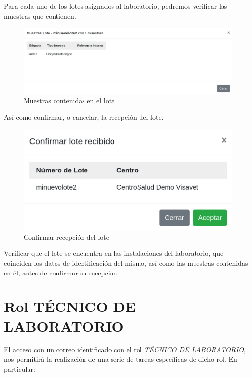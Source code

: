 \documentclass[a4paper,spanish]{paper}
\begin{document}
Para cada uno de los lotes asignados al laboratorio, podremos verificar las muestras que contienen.

\begin{figure}[h]
\centering
\includegraphics[scale=0.6]{Figs/Fig12.png}
\caption{Muestras contenidas en el lote}
\label{Fig12}
\end{figure}

Así como confirmar, o cancelar, la recepción del lote.

\begin{figure}[h]
\centering
\includegraphics[scale=0.6]{Figs/Fig13.png}
\caption{Confirmar recepción del lote}
\label{Fig13}
\end{figure}

\medskip
\begin{tcolorbox}[colback=blue!3!white,colframe=blue(ryb)!50!black,title=\textbf{Tip}]

Verificar que el lote se encuentra en las instalaciones del laboratorio, que coinciden los datos de identificación del mismo, así como las muestras contenidas en él, antes de confirmar su recepción.

\end{tcolorbox}

\section{Rol TÉCNICO DE LABORATORIO}    

El acceso con un correo identificado con el rol \textit{TÉCNICO DE LABORATORIO}, nos permitirá la realización de una serie de tareas específicas de dicho rol. En particular:
\end{document}
